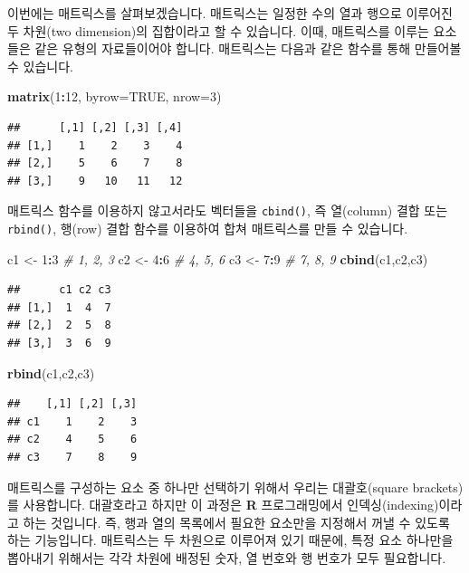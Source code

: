 \documentclass[]{book}
\newenvironment{Shaded}{\begin{snugshade}}{\end{snugshade}}
\newcommand{\CommentTok}[1]{\textcolor[rgb]{0.56,0.35,0.01}{\textit{#1}}}
\newcommand{\DataTypeTok}[1]{\textcolor[rgb]{0.13,0.29,0.53}{#1}}
\newcommand{\DecValTok}[1]{\textcolor[rgb]{0.00,0.00,0.81}{#1}}
\newcommand{\KeywordTok}[1]{\textcolor[rgb]{0.13,0.29,0.53}{\textbf{#1}}}
\newcommand{\NormalTok}[1]{#1}
\newcommand{\OperatorTok}[1]{\textcolor[rgb]{0.81,0.36,0.00}{\textbf{#1}}}
\newcommand{\OtherTok}[1]{\textcolor[rgb]{0.56,0.35,0.01}{#1}}
\newcommand{\StringTok}[1]{\textcolor[rgb]{0.31,0.60,0.02}{#1}}
\begin{document}
이번에는 매트릭스를 살펴보겠습니다. 매트릭스는 일정한 수의 열과 행으로 이루어진 두 차원(two dimension)의 집합이라고 할 수 있습니다. 이때, 매트릭스를 이루는 요소들은 같은 유형의 자료들이어야 합니다. 매트릭스는 다음과 같은 함수를 통해 만들어볼 수 있습니다.

\begin{Shaded}
\begin{Highlighting}[]
\KeywordTok{matrix}\NormalTok{(}\DecValTok{1}\OperatorTok{:}\DecValTok{12}\NormalTok{, }\DataTypeTok{byrow=}\OtherTok{TRUE}\NormalTok{, }\DataTypeTok{nrow=}\DecValTok{3}\NormalTok{)}
\end{Highlighting}
\end{Shaded}

\begin{verbatim}
##      [,1] [,2] [,3] [,4]
## [1,]    1    2    3    4
## [2,]    5    6    7    8
## [3,]    9   10   11   12
\end{verbatim}

매트릭스 함수를 이용하지 않고서라도 벡터들을 \texttt{cbind()}, 즉 열(column) 결합 또는 \texttt{rbind()}, 행(row) 결합 함수를 이용하여 합쳐 매트릭스를 만들 수 있습니다.

\begin{Shaded}
\begin{Highlighting}[]
\NormalTok{c1 <-}\StringTok{ }\DecValTok{1}\OperatorTok{:}\DecValTok{3}  \CommentTok{# 1, 2, 3}
\NormalTok{c2 <-}\StringTok{ }\DecValTok{4}\OperatorTok{:}\DecValTok{6}  \CommentTok{# 4, 5, 6}
\NormalTok{c3 <-}\StringTok{ }\DecValTok{7}\OperatorTok{:}\DecValTok{9}  \CommentTok{# 7, 8, 9}
\KeywordTok{cbind}\NormalTok{(c1,c2,c3)}
\end{Highlighting}
\end{Shaded}

\begin{verbatim}
##      c1 c2 c3
## [1,]  1  4  7
## [2,]  2  5  8
## [3,]  3  6  9
\end{verbatim}

\begin{Shaded}
\begin{Highlighting}[]
\KeywordTok{rbind}\NormalTok{(c1,c2,c3)}
\end{Highlighting}
\end{Shaded}

\begin{verbatim}
##    [,1] [,2] [,3]
## c1    1    2    3
## c2    4    5    6
## c3    7    8    9
\end{verbatim}

매트릭스를 구성하는 요소 중 하나만 선택하기 위해서 우리는 대괄호(square brackets)를 사용합니다. 대괄호라고 하지만 이 과정은 \textbf{R} 프로그래밍에서 인덱싱(indexing)이라고 하는 것입니다. 즉, 행과 열의 목록에서 필요한 요소만을 지정해서 꺼낼 수 있도록 하는 기능입니다. 매트릭스는 두 차원으로 이루어져 있기 때문에, 특정 요소 하나만을 뽑아내기 위해서는 각각 차원에 배정된 숫자, 열 번호와 행 번호가 모두 필요합니다.
\end{document}

